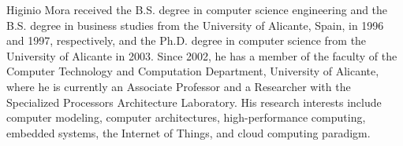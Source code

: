 \documentclass[preprint,3p]{elsarticle}
\begin{document}
{Higinio Mora} received the B.S. degree in computer science engineering and the B.S. degree in business studies from the University of Alicante, Spain, in 1996 and 1997, respectively, and the Ph.D. degree in computer science from the University of Alicante in 2003. Since 2002, he has a member of the faculty of the Computer Technology and Computation Department, University of Alicante, where he is currently an Associate Professor and a Researcher with the Specialized Processors Architecture Laboratory. His research interests include computer modeling, computer architectures, high-performance computing, embedded systems, the Internet of Things, and cloud computing paradigm.
\end{document}
